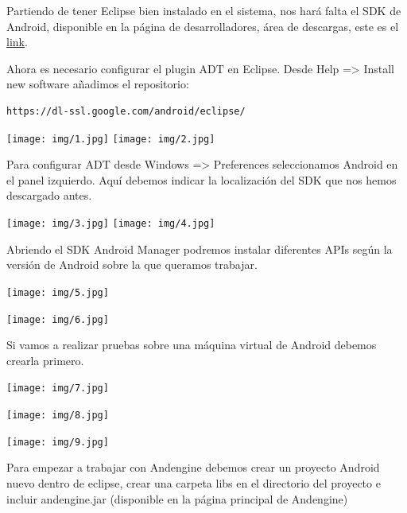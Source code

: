 \documentclass[12 pt, a4paper, twoside]{article}
\begin{document}
Partiendo de tener Eclipse bien instalado en el sistema, nos hará
falta el SDK de Android, disponible en la página de desarrolladores,
área de descargas, este es el \href{
  http://developer.android.com/sdk/index.html}{link}.

Ahora es necesario configurar el plugin ADT en Eclipse. Desde Help =>
Install new software añadimos el repositorio:
\begin{verbatim}
https://dl-ssl.google.com/android/eclipse/
\end{verbatim}

\texttt{[image: img/1.jpg]}
\texttt{[image: img/2.jpg]}

Para configurar ADT desde Windows => Preferences seleccionamos Android
en el panel izquierdo. Aquí debemos indicar la localización del SDK
que nos hemos descargado antes.

\texttt{[image: img/3.jpg]}
\texttt{[image: img/4.jpg]}

\clearpage
Abriendo el SDK Android Manager podremos instalar diferentes APIs
según la versión de Android sobre la que queramos trabajar.

\begin{center}
  \texttt{[image: img/5.jpg]}

  \texttt{[image: img/6.jpg]}
\end{center}

\clearpage
Si vamos a realizar pruebas sobre una máquina virtual de Android
debemos crearla primero.

\begin{center}

\texttt{[image: img/7.jpg]}

\texttt{[image: img/8.jpg]}

\texttt{[image: img/9.jpg]}
\end{center}


Para empezar a trabajar con Andengine debemos crear un proyecto
Android nuevo dentro de eclipse, crear una carpeta libs en el
directorio del proyecto e incluir andengine.jar (disponible en la
página principal de Andengine)
\end{document}
